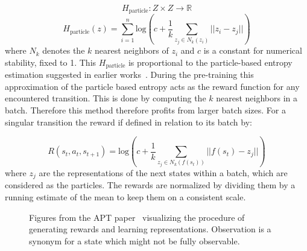 \documentclass{article}
\begin{document}
\begin{equation}
    H_{\text{particle}}: Z\times Z \xrightarrow{} \mathbb{R}
\end{equation}
\begin{equation*}
    H_{\text{particle}}(z) = \sum_{i=1}^n \text{log}(c + \frac{1}{k} \sum_{z_j \in N_k(z_i)} ||z_i - z_j||)
\end{equation*}
where $N_k$ denotes the $k$ nearest neighbors of $z_i$ and $c$ is a constant for numerical stability, fixed to 1.
This $H_{\text{particle}} $ is proportional to the particle-based entropy
estimation suggested in earlier works~\cite{DBLP:journals/corr/abs-2103-04551}.
During the pre-training this approximation of the particle based entropy acts as the
reward function for any encountered transition. This is done by computing the $k$ nearest
neighbors in a batch. Therefore this method therefore profits from larger batch sizes. For a
singular transition the reward if defined in relation to its batch by:

\begin{equation}
    R(s_t, a_t, s_{t+1}) = \text{log}(c + \frac{1}{k} \sum_{z_j \in N_k(f(s_t))} ||f(s_t) - z_j||)
\end{equation}
where $z_j$ are the representations of the next states within a batch, which are considered as the particles.
The rewards are normalized by dividing them by a running estimate of the mean to keep them on a consistent scale. 

\begin{figure}[h]
    \centering
    \qquad
    \caption{Figures from the APT paper~\cite{DBLP:journals/corr/abs-2103-04551} visualizing the procedure of 
    generating rewards and learning representations. Observation is a synonym for a state which might not be
    fully observable.}
\end{figure}
\end{document}
